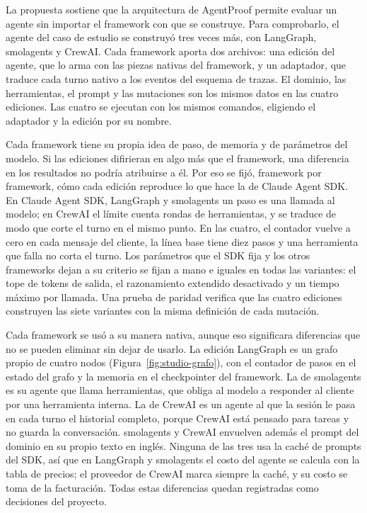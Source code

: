 La propuesta sostiene que la arquitectura de AgentProof permite evaluar un agente sin importar el framework con que se construye. Para comprobarlo, el agente del caso de estudio se construyó tres veces más, con LangGraph, smolagents y CrewAI. Cada framework aporta dos archivos: una edición del agente, que lo arma con las piezas nativas del framework, y un adaptador, que traduce cada turno nativo a los eventos del esquema de trazas. El dominio, las herramientas, el prompt y las mutaciones son los mismos datos en las cuatro ediciones. Las cuatro se ejecutan con los mismos comandos, eligiendo el adaptador y la edición por su nombre.
\par
{} Cada framework tiene su propia idea de paso, de memoria y de parámetros del modelo. Si las ediciones difirieran en algo más que el framework, una diferencia en los resultados no podría atribuirse a él. Por eso se fijó, framework por framework, cómo cada edición reproduce lo que hace la de Claude Agent SDK. En Claude Agent SDK, LangGraph y smolagents un paso es una llamada al modelo; en CrewAI el límite cuenta rondas de herramientas, y se traduce de modo que corte el turno en el mismo punto. En las cuatro, el contador vuelve a cero en cada mensaje del cliente, la línea base tiene diez pasos y una herramienta que falla no corta el turno. Los parámetros que el SDK fija y los otros frameworks dejan a su criterio se fijan a mano e iguales en todas las variantes: el tope de tokens de salida, el razonamiento extendido desactivado y un tiempo máximo por llamada. Una prueba de paridad verifica que las cuatro ediciones construyen las siete variantes con la misma definición de cada mutación.
\par
Cada framework se usó a su manera nativa, aunque eso significara diferencias que no se pueden eliminar sin dejar de usarlo. La edición LangGraph es un grafo propio de cuatro nodos (Figura~\ref{fig:studio-grafo}), con el contador de pasos en el estado del grafo y la memoria en el checkpointer del framework. La de smolagents es su agente que llama herramientas, que obliga al modelo a responder al cliente por una herramienta interna. La de CrewAI es un agente al que la sesión le pasa en cada turno el historial completo, porque CrewAI está pensado para tareas y no guarda la conversación. smolagents y CrewAI envuelven además el prompt del dominio en su propio texto en inglés. Ninguna de las tres usa la caché de prompts del SDK, así que en LangGraph y smolagents el costo del agente se calcula con la tabla de precios; el proveedor de CrewAI marca siempre la caché, y su costo se toma de la facturación. Todas estas diferencias quedan registradas como decisiones del proyecto.

